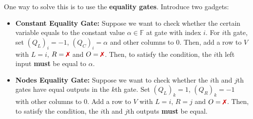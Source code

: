 \documentclass[../../book.tex]{subfiles}
\begin{document}
\begin{proposition}

One way to solve this is to use the \textbf{equality gates}. Introduce two gadgets:
\begin{itemize}
    \item \textbf{Constant Equality Gate:} Suppose we want to check whether the
    certain variable equals to the constant value $\alpha \in \mathbb{F}$ at
    gate with index $i$. For $i$th gate, set $(Q_L)_i = -1$, $(Q_C)_i = \alpha$
    and other columns to $0$. Then, add a row to $V$ with $L = i$, $R =
    \text{\xmark}$ and $O = \text{\xmark}$. Then, to satisfy the condition, the
    $i$th left input \textbf{must} be equal to $\alpha$.
    \item \textbf{Nodes Equality Gate:} Suppose we want to check whether the
    $i$th and $j$th gates have equal outputs in the $k$th gate. Set $(Q_L)_k = 1$, $(Q_R)_k = -1$ 
    with other columns to $0$. Add a row to $V$ with $L =
    i$, $R = j$ and $O = \text{\xmark}$. Then, to satisfy the condition, the
    $i$th and $j$th outputs \textbf{must} be equal.
\end{itemize}

\end{proposition}
\end{document}
